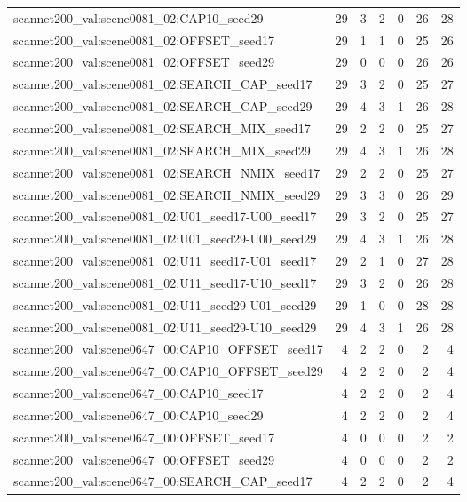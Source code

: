 \begin{table}[t]
\begin{tabular}{lrrrrrr}
scannet200\_val:scene0081\_02:CAP10\_seed29 & 29 & 3 & 2 & 0 & 26 & 28 \\
scannet200\_val:scene0081\_02:OFFSET\_seed17 & 29 & 1 & 1 & 0 & 25 & 26 \\
scannet200\_val:scene0081\_02:OFFSET\_seed29 & 29 & 0 & 0 & 0 & 26 & 26 \\
scannet200\_val:scene0081\_02:SEARCH\_CAP\_seed17 & 29 & 3 & 2 & 0 & 25 & 27 \\
scannet200\_val:scene0081\_02:SEARCH\_CAP\_seed29 & 29 & 4 & 3 & 1 & 26 & 28 \\
scannet200\_val:scene0081\_02:SEARCH\_MIX\_seed17 & 29 & 2 & 2 & 0 & 25 & 27 \\
scannet200\_val:scene0081\_02:SEARCH\_MIX\_seed29 & 29 & 4 & 3 & 1 & 26 & 28 \\
scannet200\_val:scene0081\_02:SEARCH\_NMIX\_seed17 & 29 & 2 & 2 & 0 & 25 & 27 \\
scannet200\_val:scene0081\_02:SEARCH\_NMIX\_seed29 & 29 & 3 & 3 & 0 & 26 & 29 \\
scannet200\_val:scene0081\_02:U01\_seed17-U00\_seed17 & 29 & 3 & 2 & 0 & 25 & 27 \\
scannet200\_val:scene0081\_02:U01\_seed29-U00\_seed29 & 29 & 4 & 3 & 1 & 26 & 28 \\
scannet200\_val:scene0081\_02:U11\_seed17-U01\_seed17 & 29 & 2 & 1 & 0 & 27 & 28 \\
scannet200\_val:scene0081\_02:U11\_seed17-U10\_seed17 & 29 & 3 & 2 & 0 & 26 & 28 \\
scannet200\_val:scene0081\_02:U11\_seed29-U01\_seed29 & 29 & 1 & 0 & 0 & 28 & 28 \\
scannet200\_val:scene0081\_02:U11\_seed29-U10\_seed29 & 29 & 4 & 3 & 1 & 26 & 28 \\
scannet200\_val:scene0647\_00:CAP10\_OFFSET\_seed17 & 4 & 2 & 2 & 0 & 2 & 4 \\
scannet200\_val:scene0647\_00:CAP10\_OFFSET\_seed29 & 4 & 2 & 2 & 0 & 2 & 4 \\
scannet200\_val:scene0647\_00:CAP10\_seed17 & 4 & 2 & 2 & 0 & 2 & 4 \\
scannet200\_val:scene0647\_00:CAP10\_seed29 & 4 & 2 & 2 & 0 & 2 & 4 \\
scannet200\_val:scene0647\_00:OFFSET\_seed17 & 4 & 0 & 0 & 0 & 2 & 2 \\
scannet200\_val:scene0647\_00:OFFSET\_seed29 & 4 & 0 & 0 & 0 & 2 & 2 \\
scannet200\_val:scene0647\_00:SEARCH\_CAP\_seed17 & 4 & 2 & 2 & 0 & 2 & 4 \\

\end{tabular}
\end{table}
